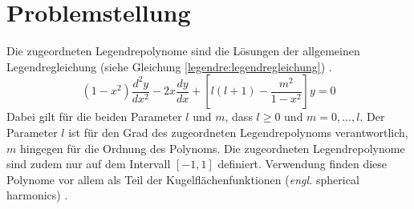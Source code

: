 %
%
%
\section{Problemstellung
\label{legendre:section:problemstellung}}
Die zugeordneten Legendrepolynome sind die Lösungen der allgemeinen Legendregleichung (siehe Gleichung \eqref{legendre:legendregleichung}) \cite{legendre:assoc-legendre-poly-wolfram} \cite{legendre:assoc-legendre-diff-wolfram}.
\begin{equation}
(1-x^2) \frac{d^2y}{dx^2}
-2x \frac{dy}{dx}
+ \left[ l(l+1)- \frac{m^2}{1-x^2} \right] y
=0
\label{legendre:legendregleichung}
\end{equation}
Dabei gilt für die beiden Parameter $l$ und $m$, dass $l\geq 0$ und $m=0, \ldots , l$.
Der Parameter $l$ ist für den Grad des zugeordneten Legendrepolynoms verantwortlich, $m$ hingegen für die Ordnung des Polynoms.
Die zugeordneten Legendrepolynome sind zudem nur auf dem Intervall $[-1, 1]$ definiert.
Verwendung finden diese Polynome vor allem als Teil der Kugelflächenfunktionen (\textit{engl.} spherical harmonics) \cite{legendre:spherical-harmonic-wolfram}.

